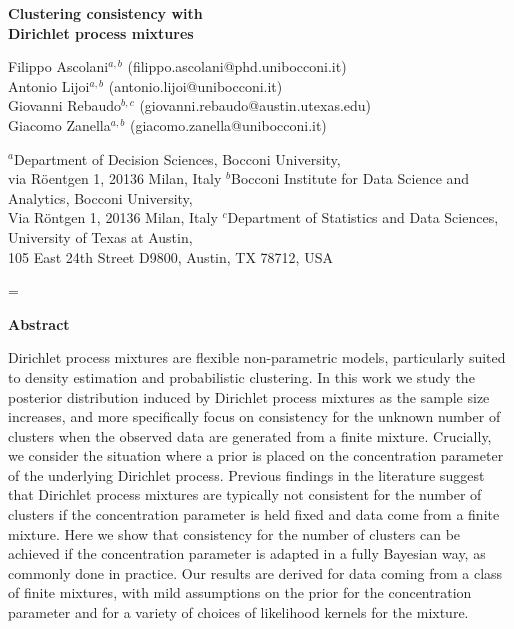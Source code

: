 \documentclass[12pt]{article}
\begin{document}
	\thispagestyle{empty}
	\baselineskip=28pt
	
	
	\begin{center}
		{\LARGE{\bf Clustering consistency with\\ Dirichlet process mixtures
		}}
	\end{center}
	\baselineskip=12pt
	\vskip 24pt 
	
	
	\small
	\baselineskip=14pt
	\begin{center}
	Filippo Ascolani$^{a,b}$ (filippo.ascolani@phd.unibocconi.it)\\
	Antonio Lijoi$^{a,b}$ (antonio.lijoi@unibocconi.it)\\
	Giovanni Rebaudo$^{b,c}$ (giovanni.rebaudo@austin.utexas.edu)\\
	Giacomo Zanella$^{a,b}$ (giacomo.zanella@unibocconi.it)
	
	\vskip 3mm
	$^{a}$Department of Decision Sciences, Bocconi University,\\
	via R\"oentgen 1, 20136 Milan, Italy
	\vskip 4pt 
	$^{b}$Bocconi Institute for Data Science and Analytics, Bocconi University,\\ 
	Via Röntgen 1, 20136 Milan, Italy
	\vskip 4pt 
	$^{c}$Department of Statistics and Data Sciences,
	University of Texas at Austin,\\
	105 East 24th Street D9800, Austin, TX 78712, USA\\	
\end{center}
	\vskip 24pt 
	
	
\setcounter{page}{0}
\newlength{\gnat}
\setlength{\gnat}{20pt}
\baselineskip=\gnat
	

\begin{center}
	{\Large{\bf Abstract}} 
\end{center}
\baselineskip=16pt
	Dirichlet process mixtures are flexible non-parametric models, particularly suited to density estimation and probabilistic clustering.
	In this work we study the posterior distribution induced by Dirichlet process mixtures as the sample size increases, and more specifically focus on consistency for the unknown number of clusters when the observed data are generated from a finite mixture. Crucially, we consider the situation where a prior is placed on the concentration parameter of the underlying Dirichlet process. Previous findings in the literature suggest that Dirichlet process mixtures are typically not consistent for the number of clusters if the concentration parameter is held fixed and data come from a finite mixture. Here we show that consistency for the number of clusters can be achieved if the concentration parameter is adapted in a fully Bayesian way, as commonly done in practice. Our results are derived for data coming from a class of finite mixtures, with mild assumptions on the prior for the concentration parameter and for a variety of choices of likelihood kernels for the mixture.
	
\end{document}

